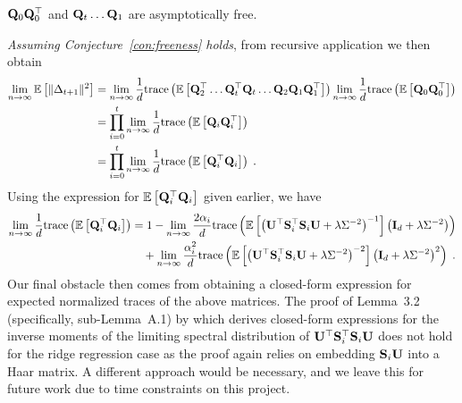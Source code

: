 \begin{conjecture} \label{con:freeness}
 $\mathbf{Q}_0\mathbf{Q}_0^\top$ and $\mathbf{Q}_t\ldots\mathbf{Q}_1$ are asymptotically free.
\end{conjecture}

\textit{Assuming Conjecture~\ref{con:freeness} holds}, from recursive application we then obtain
\begin{align*}
\lim_{n\rightarrow\infty}\mathbb{E}\left[\|\Delta_{t+1}\|^2\right] &= \lim_{n\rightarrow\infty}\frac{1}{d}\mathrm{trace}\left(\mathbb{E}\left[\mathbf{Q}_2^\top\ldots \mathbf{Q}_t^\top\mathbf{Q}_t\ldots\mathbf{Q}_2\mathbf{Q}_1\mathbf{Q}_1^\top\right]\right)\lim_{n\rightarrow\infty}\frac{1}{d}\mathrm{trace}\left(\mathbb{E}\left[\mathbf{Q}_0\mathbf{Q}_0^\top\right]\right) \\
&= \prod_{i=0}^t\lim_{n\rightarrow\infty}\frac{1}{d}\mathrm{trace}\left(\mathbb{E}\left[\mathbf{Q}_i\mathbf{Q}_i^\top\right]\right) \\
&= \prod_{i=0}^t\lim_{n\rightarrow\infty}\frac{1}{d}\mathrm{trace}\left(\mathbb{E}\left[\mathbf{Q}_i^\top\mathbf{Q}_i\right]\right) \;.
\end{align*}
Using the expression for $\mathbb{E}\left[\mathbf{Q}_i^\top\mathbf{Q}_i\right]$ given earlier, we have
\begin{align*}
\lim_{n\rightarrow\infty}\frac{1}{d}\mathrm{trace}\left(\mathbb{E}\left[\mathbf{Q}_i^\top\mathbf{Q}_i\right]\right) &= 1 - \lim_{n\rightarrow\infty}\frac{2\alpha_i}{d}\mathrm{trace}\left(\mathbb{E}\left[\left(\mathbf{U}^\top\mathbf{S}_i^\top\mathbf{S}_i\mathbf{U} + \lambda\Sigma^{-2}\right)^{-1}\right]\left(\mathbf{I}_d + \lambda\Sigma^{-2}\right)\right) \\
&\quad + \lim_{n\rightarrow\infty}\frac{\alpha_i^2}{d}\mathrm{trace}\left(\mathbb{E}\left[\left(\mathbf{U}^\top\mathbf{S}_i^\top\mathbf{S}_i\mathbf{U} + \lambda\Sigma^{-2}\right)^{-2}\right]\left(\mathbf{I}_d + \lambda\Sigma^{-2}\right)^2\right) \;.
\end{align*}
Our final obstacle then comes from obtaining a closed-form expression for expected normalized traces of the above matrices. The proof of Lemma~3.2 (specifically, sub-Lemma~A.1) by \citet{Lacotte:2020} which derives closed-form expressions for the inverse moments of the limiting spectral distribution of $\mathbf{U}^\top\mathbf{S}_i^\top\mathbf{S}_i\mathbf{U}$ does not hold for the ridge regression case as the proof again relies on embedding $\mathbf{S}_i\mathbf{U}$ into a Haar matrix. A different approach would be necessary, and we leave this for future work due to time constraints on this project.
\\

